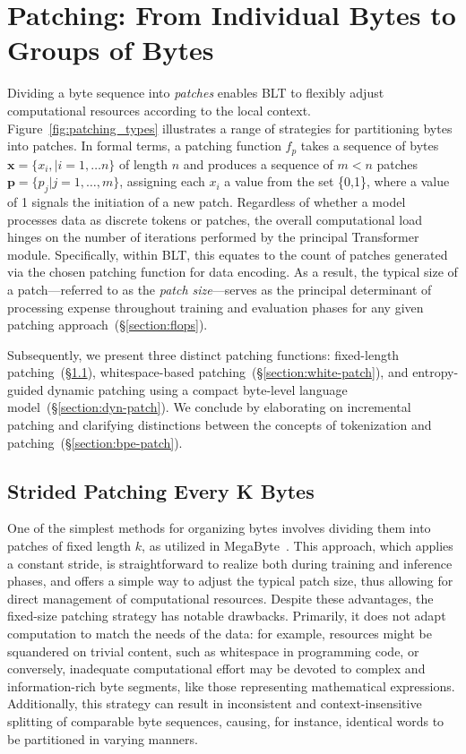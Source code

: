 \section{Patching: From Individual Bytes to Groups of Bytes}
\label{section:patching}

Dividing a byte sequence into \textit{patches} enables {\textsc BLT} to flexibly adjust computational resources according to the local context. Figure~\ref{fig:patching_types} illustrates a range of strategies for partitioning bytes into patches. In formal terms, a patching function $f_p$ takes a sequence of bytes $\pmb{x}=\{x_i,|i=1,\ldots n\}$ of length $n$ and produces a sequence of $m < n$ patches $\pmb{p}=\{p_j|j=1,\ldots,m\}$, assigning each $x_i$ a value from the set \{0,1\}, where a value of 1 signals the initiation of a new patch. Regardless of whether a model processes data as discrete tokens or patches, the overall computational load hinges on the number of iterations performed by the principal Transformer module. Specifically, within {\textsc BLT}, this equates to the count of patches generated via the chosen patching function for data encoding. As a result, the typical size of a patch—referred to as the \textit{patch size}—serves as the principal determinant of processing expense throughout training and evaluation phases for any given patching approach~(\S\ref{section:flops}).

Subsequently, we present three distinct patching functions: fixed-length patching~(\S\ref{section:static-patch}), whitespace-based patching~(\S\ref{section:white-patch}), and entropy-guided dynamic patching using a compact byte-level language model~(\S\ref{section:dyn-patch}). We conclude by elaborating on incremental patching and clarifying distinctions between the concepts of tokenization and patching~(\S\ref{section:bpe-patch}).

\subsection{Strided Patching Every K Bytes}
\label{section:static-patch}

One of the simplest methods for organizing bytes involves dividing them into patches of fixed length $k$, as utilized in MegaByte~\citep{yu2023megabyte}. This approach, which applies a constant stride, is straightforward to realize both during training and inference phases, and offers a simple way to adjust the typical patch size, thus allowing for direct management of computational resources. Despite these advantages, the fixed-size patching strategy has notable drawbacks. Primarily, it does not adapt computation to match the needs of the data: for example, resources might be squandered on trivial content, such as whitespace in programming code, or conversely, inadequate computational effort may be devoted to complex and information-rich byte segments, like those representing mathematical expressions. Additionally, this strategy can result in inconsistent and context-insensitive splitting of comparable byte sequences, causing, for instance, identical words to be partitioned in varying manners.

